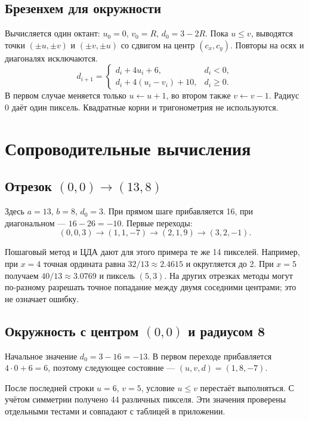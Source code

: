 \documentclass[12pt,a4paper]{extarticle}
\begin{document}
\subsection{Брезенхем для окружности}
Вычисляется один октант: $u_0=0$, $v_0=R$, $d_0=3-2R$. Пока $u\le v$, выводятся точки $(\pm u,\pm v)$ и $(\pm v,\pm u)$ со сдвигом на центр $(c_x,c_y)$. Повторы на осях и диагоналях исключаются.
\begin{equation}
 d_{i+1}=\begin{cases}
 d_i+4u_i+6,&d_i<0,\\
 d_i+4(u_i-v_i)+10,&d_i\ge0.
 \end{cases}
\end{equation}
В первом случае меняется только $u\leftarrow u+1$, во втором также $v\leftarrow v-1$. Радиус 0 даёт один пиксель. Квадратные корни и тригонометрия не используются.

\clearpage
\section{Сопроводительные вычисления}
\subsection{Отрезок $(0,0)\to(13,8)$}
Здесь $a=13$, $b=8$, $d_0=3$. При прямом шаге прибавляется 16, при диагональном --- $16-26=-10$. Первые переходы:
\[
 (0,0,3)\to(1,1,-7)\to(2,1,9)\to(3,2,-1).
\]
\begin{table}[H]
\centering\small
\caption{Трассировка отрезка: П --- прямо, Д --- диагональ; $d_i$ до перехода}

\end{table}
Пошаговый метод и ЦДА дают для этого примера те же 14 пикселей. Например, при $x=4$ точная ордината равна $32/13\approx2.4615$ и округляется до 2. При $x=5$ получаем $40/13\approx3.0769$ и пиксель $(5,3)$. На других отрезках методы могут по-разному разрешать точное попадание между двумя соседними центрами; это не означает ошибку.

\subsection{Окружность с центром $(0,0)$ и радиусом 8}
Начальное значение $d_0=3-16=-13$. В первом переходе прибавляется $4\cdot0+6=6$, поэтому следующее состояние --- $(u,v,d)=(1,8,-7)$.
\begin{table}[H]
\centering\small
\caption{Состояния одного октанта окружности}

\end{table}
После последней строки $u=6$, $v=5$, условие $u\le v$ перестаёт выполняться. С учётом симметрии получено 44 различных пикселя. Эти значения проверены отдельными тестами и совпадают с таблицей в приложении.
\end{document}
